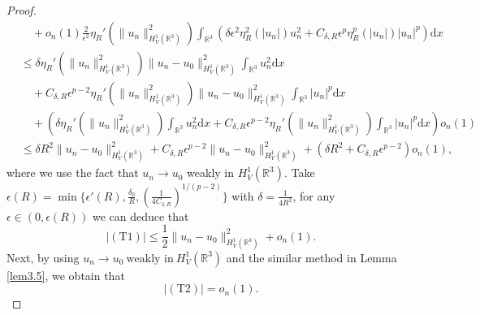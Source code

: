 \documentclass[10pt,a4paper]{amsart}
\begin{document}
\begin{proof}
\begin{equation*}
\begin{aligned}
      &\quad+o_{n}(1)\frac{2}{\epsilon^2} \eta_R'(\|u_n\|_{H^1_{V}(\mathbb{R}^3)}^2)\int_{\mathbb{R}^{3}}\left ( \delta \epsilon ^{2} \eta _{R}^{2}\left ( \left | u_n\right | \right )u_n^{2}+C_{\delta,R}\epsilon ^{p}\eta _{R}^{p}\left ( \left | u_n\right | \right )\left | u_n\right |^{p}\right )\text{d}x\\
      &\leq\delta \eta_R'(\|u_n\|_{H^1_{V}(\mathbb{R}^3)}^2) \|u_n-u_0\|^2_{H^{1}_{V}(\mathbb{R}^3)}\int_{\mathbb{R}^{3}}u_n^{2}\text{d}x \\
      &\quad+C_{\delta,R}\epsilon ^{p-2}\eta_R'(\|u_n\|_{H^1_{V}(\mathbb{R}^3)}^2)\|u_n-u_0\|^2_{H^{1}_{V}(\mathbb{R}^3)}\int_{\mathbb{R}^{3}}\left | u_n\right |^{p}\text{d}x\\
      &\quad+(\delta \eta_R'(\|u_n\|_{H^1_{V}(\mathbb{R}^3)}^2)\int_{\mathbb{R}^{3}}u_n^{2}\text{d}x+C_{\delta,R}\epsilon ^{p-2}\eta_R'(\|u_n\|_{H^1_{V}(\mathbb{R}^3)}^2)\int_{\mathbb{R}^{3}}\left | u_n\right |^{p}\text{d}x)o_{n}(1) \\
    &\leq \delta R^2\|u_n-u_0\|_{H^{1}_{V}(\mathbb{R}^3)}^{2}+C_{\delta,R}\epsilon ^{p-2}\|u_n-u_0\|_{H^{1}_{V}(\mathbb{R}^3)}^{2}+(\delta R^2+C_{\delta,R}\epsilon ^{p-2})o_{n}(1),
    \end{aligned}
\end{equation*}
where we use the fact that $u_n\to u_0$ weakly in $H^1_{V}(\mathbb{R}^3)$. Take $\epsilon(R)=\min\{\epsilon'(R),\frac{\delta_0}{R},\left(\frac{1}{4C_{\delta,R}}\right)^{1/(p-2)}\}$ with $\delta=\frac{1}{4R^2}$, for any $\epsilon\in(0,\epsilon(R))$ we can deduce that $$|(\text{T}1)|\leq \frac{1}{2}\|u_n-u_0\|_{H^{1}_{V}(\mathbb{R}^3)}^{2}+o_{n}(1).$$
Next, by using $u_{n} \to u _{0}~ \text{weakly~in}~H_{V}^{1}\left ( \mathbb{R}^{3}\right )$ and the similar method in Lemma \ref{lem3.5}, we obtain that
$$|(\text{T}2)|=o_{n}\left ( 1 \right ).$$


\end{proof}
\end{document}
